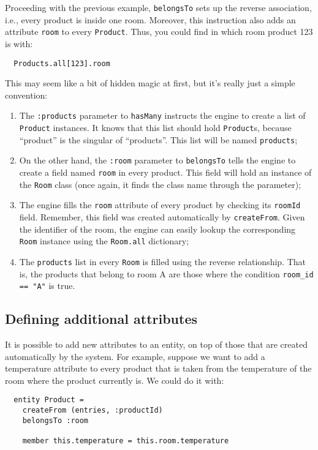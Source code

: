 \documentclass[a4,11pt]{report}
\begin{document}
Proceeding with the previous example, \verb=belongsTo= sets up the
reverse association, i.e., every product is inside one room. Moreover,
this instruction also adds an attribute \verb=room= to every
\verb=Product=. Thus, you could find in which room product 123 is
with:

\begin{lstlisting}
  Products.all[123].room
\end{lstlisting}

This may seem like a bit of hidden magic at first, but it's really
just a simple convention:

\begin{enumerate}
\item The \verb=:products= parameter to \verb=hasMany= instructs the
  engine to create a list of \verb=Product= instances. It knows that
  this list should hold \verb=Product=s, because ``product'' is the
  singular of ``products''. This list will be named \verb=products=;
\item On the other hand, the \verb=:room= parameter to
  \verb=belongsTo= tells the engine to create a field named
  \verb=room= in every product. This field will hold an instance of
  the \verb=Room= class (once again, it finds the class name through
  the parameter);
\item The engine fills the \verb=room= attribute of every product by
  checking its \verb=roomId= field. Remember, this field was created
  automatically by \verb=createFrom=. Given the identifier of the
  room, the engine can easily lookup the corresponding \verb=Room=
  instance using the \verb=Room.all= dictionary;
\item The \verb=products= list in every \verb=Room= is filled using
  the reverse relationship. That is, the products that belong to room
  A are those where the condition \verb!room_id == "A"! is true.
\end{enumerate}

\subsection{Defining additional attributes}

It is possible to add new attributes to an entity, on top of those
that are created automatically by the system. For example, suppose we
want to add a temperature attribute to every product that is taken
from the temperature of the room where the product currently is. We
could do it with:

\begin{lstlisting}
  entity Product =
    createFrom (entries, :productId)
    belongsTo :room

    member this.temperature = this.room.temperature

\end{lstlisting}
\end{document}
